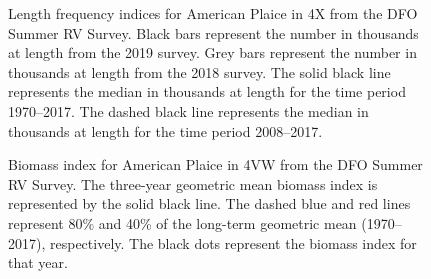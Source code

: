 \documentclass[11pt]{book}
\begin{document}
\begin{figure}[htb]

{\centering {} 

}

\caption{Length frequency indices for American Plaice in 4X from the DFO Summer RV Survey. Black bars represent the number in thousands at length from the 2019 survey. Grey bars represent the number in thousands at length from the 2018 survey. The solid black line represents the median in thousands at length for the time period 1970--2017. The dashed black line represents the median in thousands at length for the time period 2008--2017.}\label{fig:52-fig-aplaice-lengthfreq4X}
\end{figure}

\begin{figure}[htb]

{\centering {} 

}

\caption{Biomass index for American Plaice in 4VW from the DFO Summer RV Survey. The three-year geometric mean biomass index is represented by the solid black line. The dashed blue and red lines represent 80\% and 40\% of the long-term geometric mean (1970--2017), respectively. The black dots represent the biomass index for that year.}\label{fig:53-fig-aplaice-biomass4VW}
\end{figure}
\end{document}
